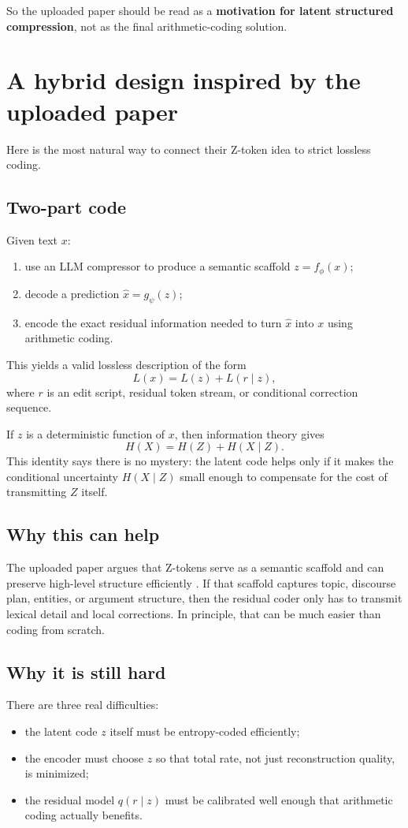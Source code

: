 \documentclass[11pt]{article}
\theoremstyle{remark}
\begin{document}
So the uploaded paper should be read as a \textbf{motivation for latent structured compression}, not as the final arithmetic-coding solution.

\section{A hybrid design inspired by the uploaded paper}

Here is the most natural way to connect their Z-token idea to strict lossless coding.

\subsection*{Two-part code}
Given text $x$:
\begin{enumerate}
    \item use an LLM compressor to produce a semantic scaffold $z = f_\phi(x)$;
    \item decode a prediction $\hat{x} = g_\psi(z)$;
    \item encode the exact residual information needed to turn $\hat{x}$ into $x$ using arithmetic coding.
\end{enumerate}

This yields a valid lossless description of the form
\[
L(x) = L(z) + L(r \mid z),
\]
where $r$ is an edit script, residual token stream, or conditional correction sequence.

If $z$ is a deterministic function of $x$, then information theory gives
\[
H(X) = H(Z) + H(X \mid Z).
\]
This identity says there is no mystery: the latent code helps only if it makes the conditional uncertainty $H(X\mid Z)$ small enough to compensate for the cost of transmitting $Z$ itself.

\subsection*{Why this can help}
The uploaded paper argues that Z-tokens serve as a semantic scaffold and can preserve high-level structure efficiently \cite{li2026}. If that scaffold captures topic, discourse plan, entities, or argument structure, then the residual coder only has to transmit lexical detail and local corrections. In principle, that can be much easier than coding from scratch.

\subsection*{Why it is still hard}
There are three real difficulties:
\begin{itemize}
    \item the latent code $z$ itself must be entropy-coded efficiently;
    \item the encoder must choose $z$ so that total rate, not just reconstruction quality, is minimized;
    \item the residual model $q(r\mid z)$ must be calibrated well enough that arithmetic coding actually benefits.
\end{itemize}
\end{document}

